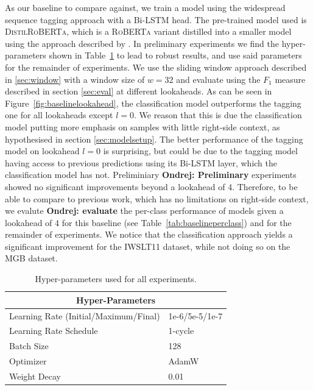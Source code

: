 \documentclass[bsc,deptreport,ai]{infthesis} %
\newcommand{\Ondrej}[1]{{\color{red} \textbf{Ondrej: #1}}}
\begin{document}
As our baseline to compare against, we train a model using the widespread sequence tagging approach \citep{Tilk2015,yitaowen2017,chen2020controllable,yi2020adversarial,sotapunctuation} with a Bi-LSTM head. The pre-trained model used is \textsc{DistilRoBERTa}, which is a \textsc{RoBERTa} variant \citep{roberta} distilled into a smaller model using the approach described by \citet{distilbert}. In preliminary experiments we find the hyper-parameters shown in Table~\ref{tab:hyped} to lead to robust results, and use said parameters for the remainder of experiments. We use the sliding window approach described in \ref{sec:window} with a window size of $w=32$ and evaluate using the $F_1$ measure described in section \ref{sec:eval} at different lookaheads. As can be seen in Figure~\ref{fig:baselinelookahead}, the classification model outperforms the tagging one for all lookaheads except $l=0$. We reason that this is due the classification model putting more emphasis on samples with little right-side context, as hypothesised in section \ref{sec:modelsetup}. The better performance of the tagging model on lookahead $l=0$ is surprising, but could be due to the tagging model having access to previous predictions using its Bi-LSTM layer, which the classification model has not. Preliminiary \Ondrej{Preliminary} experiments showed no significant improvements beyond a lookahead of 4. Therefore, to be able to compare to previous work, which has no limitations on right-side context, we evalute \Ondrej{evaluate} the per-class performance of models given a lookahead of 4 for this baseline (see Table~\ref{tab:baselineperclass}) and for the remainder of experiments. We notice that the classification approach yields a significant improvement for the IWSLT11 dataset, while not doing so on the MGB dataset.

\begin{table}[]
\centering
\begin{tabular}{ll}
\hline
\multicolumn{2}{c}{\textbf{Hyper-Parameters}}                               \\ \hline
\multicolumn{1}{l|}{Learning Rate (Initial/Maximum/Final)} & 1e-6/5e-5/1e-7 \\
\multicolumn{1}{l|}{Learning Rate Schedule}                & 1-cycle \citep{1cycle}        \\
\multicolumn{1}{l|}{Batch Size}                            & 128            \\
\multicolumn{1}{l|}{Optimizer}                          & AdamW \citep{adamw}           \\ 
\multicolumn{1}{l|}{Weight Decay}                          & 0.01           \\ \hline
\end{tabular}
\caption{Hyper-parameters used for all experiments.}
\label{tab:hyped}
\end{table}
\end{document}
